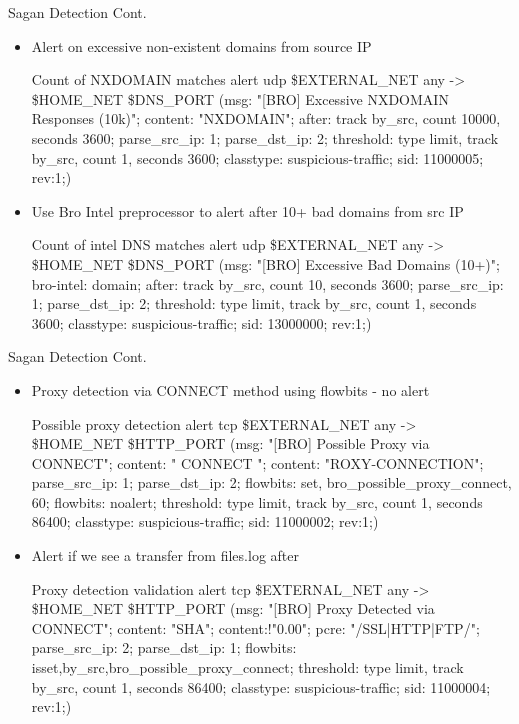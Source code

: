 \documentclass[xcolor=svgnames,handout]{beamer}
\begin{document}
\begin{frame}{Sagan Detection Cont.}
  \begin{itemize}
   \item Alert on excessive non-existent domains from source IP
    \begin{exampleblock}{Count of NXDOMAIN matches}
      \alert{alert udp \$EXTERNAL\_NET any -> \$HOME\_NET \$DNS\_PORT  (msg: "[BRO]
        Excessive NXDOMAIN Responses (10k)";  content: "NXDOMAIN"; after: track
        by\_src, count 10000, seconds 3600; parse\_src\_ip: 1; parse\_dst\_ip: 2;
        threshold: type limit, track by\_src, count 1, seconds 3600; classtype: suspicious-traffic; sid: 11000005; rev:1;)}
    \end{exampleblock}
    \item Use Bro Intel preprocessor to alert after 10+ bad domains from src IP
    \begin{exampleblock}{Count of intel DNS matches}
      \alert{alert udp \$EXTERNAL\_NET any -> \$HOME\_NET \$DNS\_PORT (msg: "[BRO] Excessive
        Bad Domains (10+)"; bro-intel: domain; after: track by\_src, count 10,
        seconds 3600; parse\_src\_ip: 1; parse\_dst\_ip: 2; threshold: type
        limit, track by\_src, count 1, seconds 3600; classtype: suspicious-traffic; sid: 13000000; rev:1;)}
    \end{exampleblock}
  \end{itemize}
\end{frame}


\begin{frame}{Sagan Detection Cont.}
  \begin{itemize}
   \item Proxy detection via CONNECT method using flowbits - no alert
    \begin{exampleblock}{Possible proxy detection}
      \alert{alert tcp \$EXTERNAL\_NET any -> \$HOME\_NET \$HTTP\_PORT (msg: "[BRO] Possible
      Proxy via CONNECT"; content: " CONNECT "; content: "ROXY-CONNECTION";
      parse\_src\_ip: 1; parse\_dst\_ip: 2; flowbits: set, bro\_possible\_proxy\_connect, 60;
      flowbits: noalert; threshold: type limit, track by\_src, count 1, seconds 86400;
      classtype: suspicious-traffic; sid: 11000002; rev:1;)}
    \end{exampleblock}
   \item Alert if we see a transfer from files.log after
    \begin{exampleblock}{Proxy detection validation}
      \alert{alert tcp \$EXTERNAL\_NET any -> \$HOME\_NET \$HTTP\_PORT (msg: "[BRO] Proxy
        Detected via CONNECT"; content: "SHA"; content:!"0.00"; pcre:
        "/SSL|HTTP|FTP/"; parse\_src\_ip: 2; parse\_dst\_ip: 1; flowbits:
        isset,by\_src,bro\_possible\_proxy\_connect; threshold: type limit, track
        by\_src, count 1, seconds 86400; classtype: suspicious-traffic; sid: 11000004; rev:1;)}
    \end{exampleblock}
  \end{itemize}
\end{frame}
\end{document}
